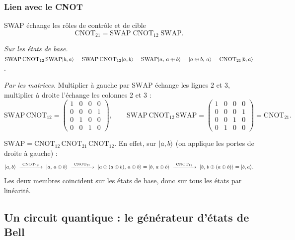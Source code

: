 \subsubsection{Lien avec le CNOT}

\begin{resultat}{SWAP échange les rôles de contrôle et de cible}
\[
  \mathrm{CNOT}_{21}=\mathrm{SWAP}\;\mathrm{CNOT}_{12}\;\mathrm{SWAP}.
\]
\end{resultat}

\emph{Sur les états de base.}
$\mathrm{SWAP}\,\mathrm{CNOT}_{12}\,\mathrm{SWAP}|b,a\rangle
=\mathrm{SWAP}\,\mathrm{CNOT}_{12}|a,b\rangle
=\mathrm{SWAP}|a,\,a\oplus b\rangle=|a\oplus b,\,a\rangle=\mathrm{CNOT}_{21}|b,a\rangle$.

\emph{Par les matrices.} Multiplier à gauche par $\mathrm{SWAP}$ échange les lignes $2$ et
$3$, multiplier à droite l'échange les colonnes $2$ et $3$ :
\[
  \mathrm{SWAP}\,\mathrm{CNOT}_{12}
  =\begin{pmatrix}1&0&0&0\\0&0&0&1\\0&1&0&0\\0&0&1&0\end{pmatrix},
  \qquad
  \mathrm{SWAP}\,\mathrm{CNOT}_{12}\,\mathrm{SWAP}
  =\begin{pmatrix}1&0&0&0\\0&0&0&1\\0&0&1&0\\0&1&0&0\end{pmatrix}=\mathrm{CNOT}_{21}.
\]

\begin{remarque}
$\mathrm{SWAP}=\mathrm{CNOT}_{12}\,\mathrm{CNOT}_{21}\,\mathrm{CNOT}_{12}$. En effet, sur
$|a,b\rangle$ (on applique les portes de droite à gauche) :
\[
  \ket{a,b}\ \xrightarrow{\ \mathrm{CNOT}_{12}\ }\ \ket{a,\,a\oplus b}
  \ \xrightarrow{\ \mathrm{CNOT}_{21}\ }\ \ket{a\oplus(a\oplus b),\,a\oplus b}=\ket{b,\,a\oplus b}
  \ \xrightarrow{\ \mathrm{CNOT}_{12}\ }\ \ket{b,\,b\oplus(a\oplus b)}=\ket{b,a}.
\]
Les deux membres coïncident sur les états de base, donc sur tous les états par linéarité.
\end{remarque}

\subsection{Un circuit quantique : le générateur d'états de Bell}\label{sec:circuit-bell}

